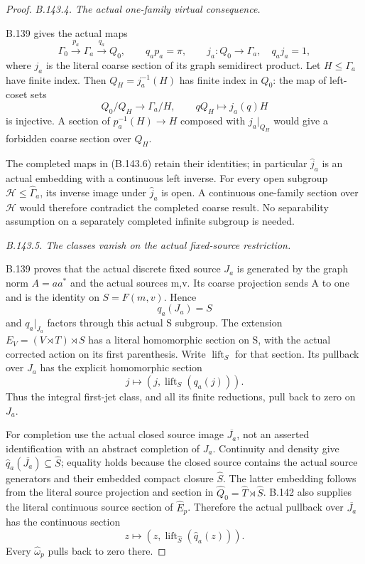 \begin{proof}
\emph{B.143.4. The actual one-family virtual consequence.}\par
B.139 gives the actual maps
\[
 \Gamma_0\xrightarrow{p_a}\Gamma_a
       \xrightarrow{q_a}Q_0,\qquad q_ap_a=\pi,
 \qquad j_a:Q_0\to\Gamma_a,\quad q_aj_a=1,
 \tag{B.143.6}
\]
where \(j_a\) is the literal coarse section of its graph
semidirect product. Let \(H\leq\Gamma_a\) have finite index.
Then \(Q_H=j_a^{-1}(H)\) has finite index in \(Q_0\):
the map of left-coset sets
\[
        Q_0/Q_H\longrightarrow\Gamma_a/H,\qquad
                 qQ_H\longmapsto j_a(q)H
\]
is injective. A section of \(p_a^{-1}(H)\to H\)
composed with \(j_a|_{Q_H}\) would give a forbidden
coarse section over \(Q_H\).

The completed maps in (B.143.6) retain their identities;
in particular \(\widehat j_a\) is an actual embedding
with a continuous left inverse. For every open subgroup
\(\mathcal H\leq\widehat\Gamma_a\),
its inverse image under \(\widehat j_a\) is open.
A continuous one-family section over \(\mathcal H\)
would therefore contradict the completed coarse result.
No separability assumption on a separately completed
infinite subgroup is needed.

\emph{B.143.5. The classes vanish on the actual fixed-source restriction.}\par
B.139 proves that the actual discrete fixed source \(J_a\)
is generated by the graph norm \(A=aa^*\) and the actual
sources m,v. Its coarse projection sends A to one and
is the identity on \(S=F(m,v)\). Hence
\[
                 q_a(J_a)=S
\]
and \(q_a|_{J_a}\) factors through this actual S subgroup.
The extension \(E_V=(V\rtimes T)\rtimes S\) has a
literal homomorphic section on S, with the actual corrected
action on its first parenthesis. Write \(\operatorname{lift}_S\)
for that section. Its pullback over \(J_a\) has the explicit
homomorphic section
\[
              j\longmapsto
                 (j,\operatorname{lift}_S(q_a(j))).
 \tag{B.143.7}
\]
Thus the integral first-jet class, and all its finite
reductions, pull back to zero on \(J_a\).

For completion use the actual closed source image
\(\overline{J_a}\), not an asserted identification with
an abstract completion of \(J_a\). Continuity and density
give \(\widehat q_a(\overline{J_a})\subseteq\widehat S\);
equality holds because the closed source contains the
actual source generators and their embedded compact closure
\(\widehat S\). The latter embedding follows from the
literal source projection and section in
\(\widehat Q_0=\widehat T\rtimes\widehat S\).
B.142 also supplies the literal continuous source section
of \(\widehat E_p\). Therefore the actual pullback over
\(\overline{J_a}\) has the continuous section
\[
              z\longmapsto
                (z,\operatorname{lift}_{\widehat S}(\widehat q_a(z))).
 \tag{B.143.8}
\]
Every \(\widehat\omega_p\) pulls back to zero there.


\end{proof}
